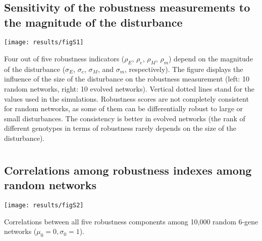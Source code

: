 \documentclass[10pt,a4paper]{article}
\newcommand{\earlyenv}{{\rho_E}}
\newcommand{\lateenv}{{\rho_e}}
\newcommand{\earlymut}{{\rho_M}}
\newcommand{\latemut}{{\rho_m}}
\begin{document}
\begin{appendices}
  \setcounter{section}{0}
  \renewcommand{\thesection}{\arabic{section}}

  \section{}
    \label{supp:sensitmag}
    \subsection*{Sensitivity of the robustness measurements to the magnitude of the disturbance}
	\begin{center}
	\texttt{[image: results/figS1]}
	\end{center}
	{\color{Gray} Four out of five robustness indicators ($\earlyenv$, $\lateenv$, $\earlymut$, $\latemut$) depend on the magnitude of the disturbance ($\sigma_E$, $\sigma_e$, $\sigma_M$, and $\sigma_m$, respectively). The figure displays the influence of the size of the disturbance on the robustness measurement (left: 10 random networks, right: 10 evolved networks). Vertical dotted lines stand for the values used in the simulations. Robustness scores are not completely consistent for random networks, as some of them can be differentially robust to large or small disturbances. The consistency is better in evolved networks (the rank of different genotypes in terms of robustness rarely depends on the size of the disturbance).  }


  \clearpage
  \section{}
    \label{supp:fullcorr}
    \subsection*{Correlations among robustness indexes among random networks}
	\begin{adjustwidth}{-1in}{0in}
	\begin{flushright}
	\texttt{[image: results/figS2]}
	\end{flushright}
	\end{adjustwidth}
	\color{Gray} Correlations between all five robustness components among 10,000 random 6-gene networks ($\mu_0=0, \sigma_0=1$). 

  \clearpage
  \section{}
    \label{supp:PC}

\end{appendices}
\end{document}
